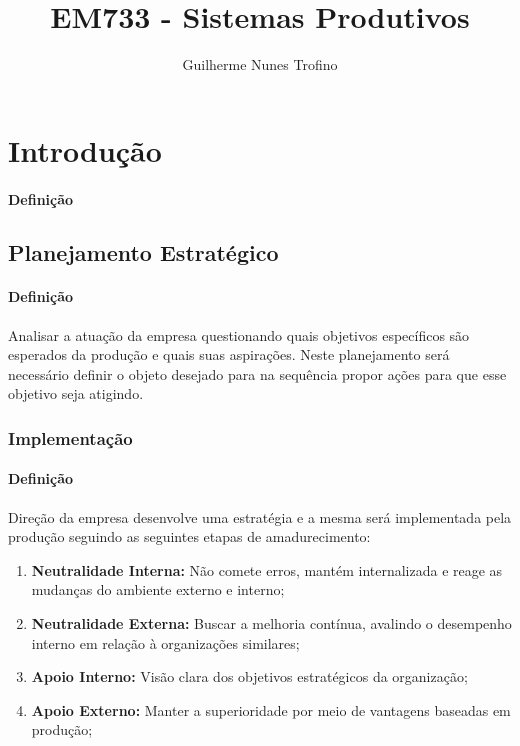 \documentclass{article}
\title{EM733 - Sistemas Produtivos}
\author{Guilherme Nunes Trofino}
\begin{document}
    \maketitle
\newpage

    \tableofcontents
\newpage

    \section{Introdução}
        \paragraph{Definição}

    \subsection{Planejamento Estratégico}
        \paragraph{Definição}Analisar a atuação da empresa questionando quais objetivos específicos são esperados da produção e quais suas aspirações. Neste planejamento será necessário definir o objeto desejado para na sequência propor ações para que esse objetivo seja atigindo.

            \subsubsection{Implementação}
                \paragraph{Definição}Direção da empresa desenvolve uma estratégia e a mesma será implementada pela produção seguindo as seguintes etapas de amadurecimento:
                \begin{enumerate}[noitemsep]
                    \item \textbf{Neutralidade Interna:} Não comete erros, mantém internalizada e reage as mudanças do ambiente externo e interno;

                    \item \textbf{Neutralidade Externa:} Buscar a melhoria contínua, avalindo o desempenho interno em relação à organizações similares;

                    \item \textbf{Apoio Interno:} Visão clara dos objetivos estratégicos da organização;

                    \item \textbf{Apoio Externo:} Manter a superioridade por meio de vantagens baseadas em produção;
                \end{enumerate}
\end{document}
